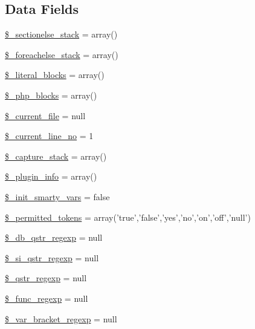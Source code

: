 \subsection*{\-Data \-Fields}
\begin{DoxyCompactItemize}
\item 
\hyperlink{class_smarty___compiler_afbea38edc660342d33a2d2116e62237a}{\$\-\_\-sectionelse\-\_\-stack} = array()
\item 
\hyperlink{class_smarty___compiler_ad5818b75883060629ca8ecaf96a78c78}{\$\-\_\-foreachelse\-\_\-stack} = array()
\item 
\hyperlink{class_smarty___compiler_ab4cc9376b47cdd08a6cd3ce4e68809c1}{\$\-\_\-literal\-\_\-blocks} = array()
\item 
\hyperlink{class_smarty___compiler_a1f04719e4f33024363b33fc5cf7f76d7}{\$\-\_\-php\-\_\-blocks} = array()
\item 
\hyperlink{class_smarty___compiler_a4c6ef40a0c9534d4c25ec77cd4e8d388}{\$\-\_\-current\-\_\-file} = null
\item 
\hyperlink{class_smarty___compiler_ac9f9994f6a399d7a682d828324e153b2}{\$\-\_\-current\-\_\-line\-\_\-no} = 1
\item 
\hyperlink{class_smarty___compiler_a432edd60bdfac5d87814fb00c2661b20}{\$\-\_\-capture\-\_\-stack} = array()
\item 
\hyperlink{class_smarty___compiler_a9adea7e6332e251373f97475a608f449}{\$\-\_\-plugin\-\_\-info} = array()
\item 
\hyperlink{class_smarty___compiler_aeff0dc90f88a8159fc26365ada4b9c7f}{\$\-\_\-init\-\_\-smarty\-\_\-vars} = false
\item 
\hyperlink{class_smarty___compiler_ad2fab67ee277e3420a9add51850c52cd}{\$\-\_\-permitted\-\_\-tokens} = array('true','false','yes','no','on','off','null')
\item 
\hyperlink{class_smarty___compiler_a08f3b03133a4c421b057ed0fbe9fde1f}{\$\-\_\-db\-\_\-qstr\-\_\-regexp} = null
\item 
\hyperlink{class_smarty___compiler_ae0f5ad8fa4f39bf3841b4050118639e4}{\$\-\_\-si\-\_\-qstr\-\_\-regexp} = null
\item 
\hyperlink{class_smarty___compiler_ada192075f87a21c4a276434572032dc5}{\$\-\_\-qstr\-\_\-regexp} = null
\item 
\hyperlink{class_smarty___compiler_af61216a1435e5a41b5b572360aeb7f80}{\$\-\_\-func\-\_\-regexp} = null
\item 
\hyperlink{class_smarty___compiler_ad7ef814a6d41972d34c9ea972e2555e7}{\$\-\_\-var\-\_\-bracket\-\_\-regexp} = null

\end{DoxyCompactItemize}
